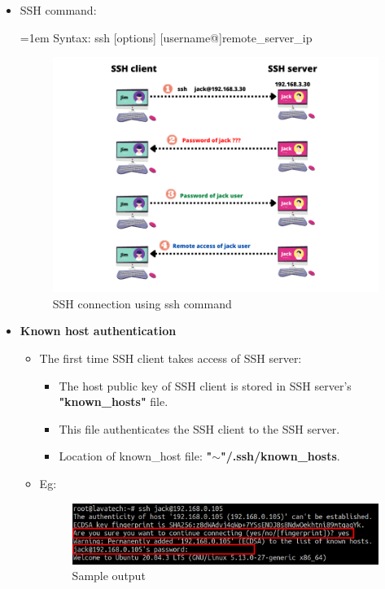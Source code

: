 \setlength{\columnsep}{3pt}
\begin{flushleft}

\bigskip
\begin{itemize}
	\item SSH command:
	\bigskip
	\begin{tcolorbox}[breakable,notitle,boxrule=0pt,colback=pink,colframe=pink]
		\color{black}
		\font=1em
		Syntax: ssh [options] [username@]remote\_server\_ip
		\font=4pt
	\end{tcolorbox}
	
	\begin{figure}[h!]
		\centering
		\includegraphics[scale=0.7]{content/chapter19/images/ssh_access.png}
		\caption{SSH connection using ssh command}
		\label{fig:stage5}
	\end{figure}		
	
	\newpage
	\item \textbf{Known host authentication}
	\bigskip
	\begin{itemize}
		\item The first time SSH client takes access of SSH server:
		\begin{itemize}
			\item The host public key of SSH client is stored in SSH server's \textbf{"known\_hosts"} file.
			\item This file authenticates the SSH client to the SSH server.
			\item Location of known\_host file: \textbf{{"$\sim$"}/.ssh/known\_hosts}.
		\end{itemize}
	
		\item Eg:
		\begin{figure}[h!]
			\centering
			\includegraphics[scale=0.3]{content/chapter19/images/ssh6.png}
			\caption{Sample output}
			\label{fig:stage55}
		\end{figure}
		

\end{itemize}
\end{itemize}
\end{flushleft}
